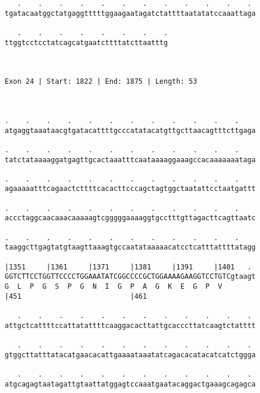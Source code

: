 \documentclass{article}
\begin{document}
\begin{Verbatim}
   .    .    .    .    .    .    .    .    .    .    .    . 
tgatacaatggctatgaggtttttggaagaatagatctattttaatatatccaaattaga
                                                            
   .    .    .    .    .    .    .    .
ttggtcctcctatcagcatgaatcttttatcttaatttg
                                       
                                       
 
Exon 24 | Start: 1822 | End: 1875 | Length: 53



.    .    .    .    .    .    .    .    .    .    .    .    
atgaggtaaataacgtgatacattttgcccatatacatgttgcttaacagtttcttgaga
                                                            
.    .    .    .    .    .    .    .    .    .    .    .    
tatctataaaaggatgagttgcactaaatttcaataaaaggaaagccacaaaaaaataga
                                                            
.    .    .    .    .    .    .    .    .    .    .    .    
agaaaaatttcagaactcttttcacacttcccagctagtggctaatattcctaatgattt
                                                            
.    .    .    .    .    .    .    .    .    .    .    .    
accctaggcaacaaacaaaaagtcgggggaaaaggtgcctttgttagacttcagttaatc
                                                            
.    .    .    .    .    .    .    .    .    .    .    .    
taaggcttgagtatgtaagttaaagtgccaatataaaaacatcctcatttattttatagg
                                                            
|1351     |1361     |1371     |1381     |1391     |1401   . 
GGTCTTCCTGGTTCCCCTGGAAATATCGGCCCCGCTGGAAAAGAAGGTCCTGTCgtaagt
G  L  P  G  S  P  G  N  I  G  P  A  G  K  E  G  P  V        
|451                          |461                          
  
   .    .    .    .    .    .    .    .    .    .    .    . 
attgctcattttccattatattttcaaggacacttattgcacccttatcaagtctatttt
                                                            
   .    .    .    .    .    .    .    .    .    .    .    . 
gtggcttatttatacatgaacacattgaaaataaatatcagacacatacatcatctggga
                                                            
   .    .    .    .    .    .    .    .    .    .    .    . 
atgcagagtaatagattgtaattatggagtccaaatgaatacaggactgaaagcagagca
                                                            

\end{Verbatim}
\end{document}
